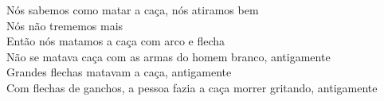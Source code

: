 \begin{linenumbers}
 
\noindent Nós sabemos como matar a caça, nós atiramos bem\\
 Nós não trememos mais\\
 Então nós matamos a caça com arco e flecha\\
 Não se matava caça com as armas do homem branco, antigamente\\
 Grandes flechas matavam a caça, antigamente\\
 Com flechas de ganchos, a pessoa fazia a caça morrer gritando, antigamente
 
\end{linenumbers}

\bigskip

